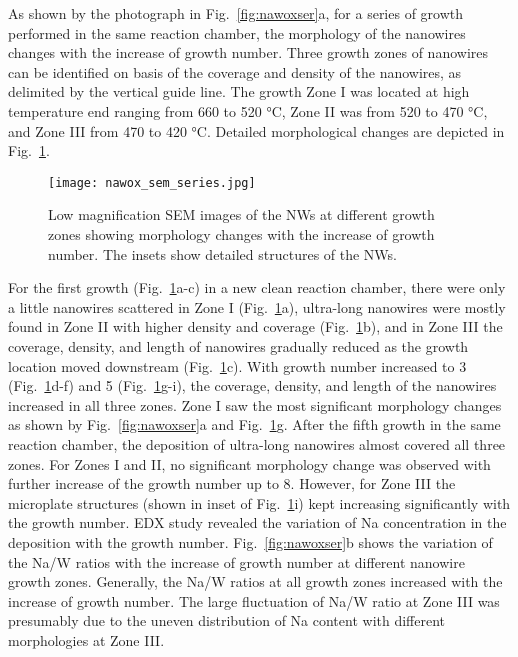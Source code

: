 As shown by the photograph in Fig.~\ref{fig:nawoxser}a, for a series of growth performed in the same reaction chamber, the morphology of the nanowires changes with the increase of growth number. Three growth zones of nanowires can be identified on basis of the coverage and density of the nanowires, as delimited by the vertical guide line. The growth Zone I was located at high temperature end ranging from 660 to 520 \si{\degreeCelsius}, Zone II was from 520 to 470 \si{\degreeCelsius}, and Zone III from 470 to 420 \si{\degreeCelsius}. Detailed morphological changes are depicted in Fig.~\ref{fig:nawoxsemall}.

\begin{figure}[htb]
\centering
\texttt{[image: nawox\_sem\_series.jpg]}
\caption[SEM images of morphology evolution]{Low magnification SEM images of the NWs at different growth zones showing morphology changes with the increase of growth number. The insets show detailed structures of the NWs.}
\label{fig:nawoxsemall}
\end{figure}

For the first growth (Fig.~\ref{fig:nawoxsemall}a-c) in a new clean reaction chamber, there were only a little nanowires scattered in Zone I (Fig.~\ref{fig:nawoxsemall}a), ultra-long nanowires were mostly found in Zone II with higher density and coverage (Fig.~\ref{fig:nawoxsemall}b), and in Zone III the coverage, density, and length of nanowires gradually reduced as the growth location moved downstream (Fig.~\ref{fig:nawoxsemall}c). With growth number increased to 3 (Fig.~\ref{fig:nawoxsemall}d-f) and 5 (Fig.~\ref{fig:nawoxsemall}g-i), the coverage, density, and length of the nanowires increased in all three zones. Zone I saw the most significant morphology changes as shown by Fig.~\ref{fig:nawoxser}a and Fig.~\ref{fig:nawoxsemall}g. After the fifth growth in the same reaction chamber, the deposition of ultra-long nanowires almost covered all three zones. For Zones I and II, no significant morphology change was observed with further increase of the growth number up to 8. However, for Zone III the microplate structures (shown in inset of Fig.~\ref{fig:nawoxsemall}i) kept increasing significantly with the growth number. EDX study revealed the variation of Na concentration in the deposition with the growth number. Fig.~\ref{fig:nawoxser}b shows the variation of the Na/W ratios with the increase of growth number at different nanowire growth zones. Generally, the Na/W ratios at all growth zones increased with the increase of growth number. The large fluctuation of Na/W ratio at Zone III was presumably due to the uneven distribution of Na content with different morphologies at Zone III.

